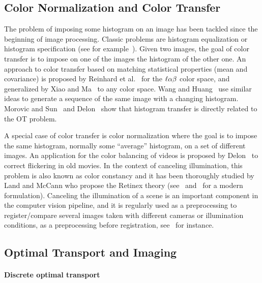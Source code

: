 \subsection{Color Normalization and Color Transfer}

The problem of imposing some histogram on an image has been tackled since the beginning of image processing. Classic problems are histogram equalization or histogram specification (see for example~\cite{Gonzalez:2001}). Given two images, the goal of color transfer is to impose on one of the images the histogram of the other one. An approach to color transfer based on matching statistical properties (mean and covariance) is proposed by Reinhard et al.~\cite{Reinhard01} for the $\ell\alpha\beta$ color space, and generalized by Xiao and Ma~\cite{Xiao:2006} to any color space. Wang and Huang~\cite{WangH04} use similar ideas to generate a sequence of the same image with a changing histogram.  Morovic and Sun~\cite{Morovic03} and Delon~\cite{Delon04} show that histogram transfer is directly related to the OT problem.

A special case of color transfer is color normalization where the goal is to impose the same histogram, normally some ``average'' histogram, on a set of different images. An application for the color balancing of videos is proposed by Delon~\cite{Delon:2006} to correct flickering in old movies. In the context of canceling illumination, this problem is also known as color constancy and it has been thoroughly studied by Land and McCann who propose the Retinex theory (see~\cite{Land:71} and~\cite{Amestoy09} for a modern formulation). Canceling the illumination of a scene is an important component in the computer vision pipeline, and it is regularly used as a preprocessing to register/compare several images taken with different cameras or illumination conditions, as a preprocessing before registration, see~\cite{Csink98} for instance. 

\subsection{Optimal Transport and Imaging}
\label{subsec-ot-imaging}

\paragraph{Discrete optimal transport}

